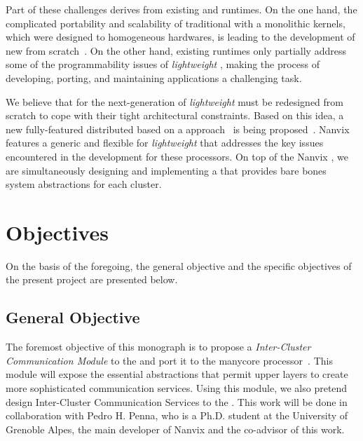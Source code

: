 	Part of these challenges derives from existing \oses and runtimes.
	On the one hand, the complicated portability and scalability of traditional \oses with a
	monolithic kernels, which were designed to homogeneous hardwares, is leading to the development
	of new \oses from scratch~\cite{Baumann2009, kluge2014, nightingale2009, rhoden2011}.
	On the other hand, existing runtimes only partially address some of the programmability issues
	of \textit{lightweight} \manycores, making the process of developing, porting, and maintaining
	applications a challenging task.

	We believe that \oses for the next-generation of \textit{lightweight} \manycores must be
	redesigned from scratch to cope with their tight architectural constraints.
	Based on this idea, a new fully-featured distributed \os based on a \multikernel approach~\cite{Baumann2009}
	is being proposed~\cite{penna2017-1,penna2017-2,penna2019}.
	Nanvix features a generic and flexible \hal for \textit{lightweight} \manycores that
	addresses the key issues encountered in the development for these processors.
	On top of the Nanvix \hal, we are simultaneously designing and implementing a \microkernel
	that provides bare bones system abstractions for each cluster.

\section{Objectives}
\label{sec.objectives}

	On the basis of the foregoing, the general objective and the specific objectives of the
	present project are presented below.

\subsection{General Objective}
\label{sec.objectives.general}

	The foremost objective of this monograph is to propose a \textit{Inter-Cluster Communication Module}
	to the \nanvix \hal and port it to the \mppa manycore processor~\cite{DeDinechin2013-1}.
	This module will expose the essential abstractions that permit upper layers to create more
	sophisticated communication services.
	Using this module, we also pretend design Inter-Cluster Communication Services to the \nanvix \microkernel.
	This work will be done in collaboration with Pedro H. Penna, who is a Ph.D. student at the
	University of Grenoble Alpes, the main developer of Nanvix and the co-advisor of this work.

